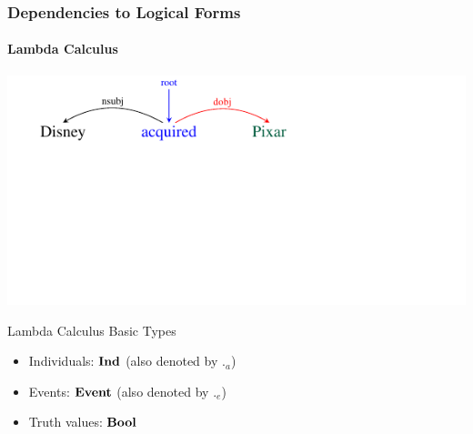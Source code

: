 \documentclass[mathserif,12pt]{beamer}
\newcommand{\itype}{{\bf Ind}}
\newcommand{\etype}{{\bf Event}}
\newcommand{\btype}{{\bf Bool}}
\begin{document}
\begin{frame}
\frametitle{Dependencies to Logical Forms}
\framesubtitle{Lambda Calculus}
\vspace{-3.3em}
\begin{center}
\includegraphics[trim=2em 9.4em 10em 0em,clip=true,scale=1.3]{figures/pixar_dobj}

\end{center}

\vspace{1cm}

\begin{block}{Lambda Calculus Basic Types}
\begin{itemize}
  \item Individuals: $\itype$ (also denoted by $._a$)
  \item Events: $\etype$ (also denoted by $._e$)
  \item Truth values: $\btype$
\end{itemize}
\end{block}
\end{frame}
\end{document}
